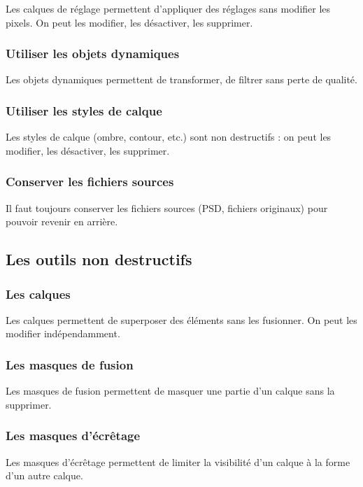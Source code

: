 Les calques de réglage permettent d'appliquer des réglages sans modifier les pixels. On peut les modifier, les désactiver, les supprimer.

\subsubsection{Utiliser les objets dynamiques}

Les objets dynamiques permettent de transformer, de filtrer sans perte de qualité.

\subsubsection{Utiliser les styles de calque}

Les styles de calque (ombre, contour, etc.) sont non destructifs : on peut les modifier, les désactiver, les supprimer.

\subsubsection{Conserver les fichiers sources}

Il faut toujours conserver les fichiers sources (PSD, fichiers originaux) pour pouvoir revenir en arrière.

\subsection{Les outils non destructifs}

\subsubsection{Les calques}

Les calques permettent de superposer des éléments sans les fusionner. On peut les modifier indépendamment.

\subsubsection{Les masques de fusion}

Les masques de fusion permettent de masquer une partie d'un calque sans la supprimer.

\subsubsection{Les masques d'écrêtage}

Les masques d'écrêtage permettent de limiter la visibilité d'un calque à la forme d'un autre calque.

